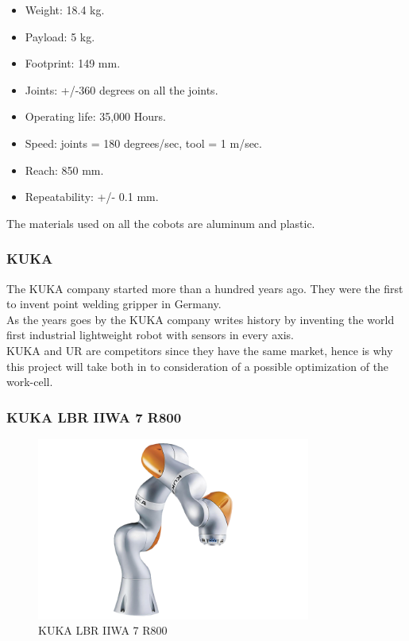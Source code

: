 \begin{itemize}
    \item Weight: 18.4 kg.
    \item Payload: 5 kg.
    \item Footprint: 149 mm.
    \item Joints: +/-360 degrees on all the joints.
    \item Operating life: 35,000 Hours.
    \item Speed: joints = 180 degrees/sec, tool = 1 m/sec.
    \item Reach: 850 mm.
    \item Repeatability: +/- 0.1 mm.
\end{itemize}
The materials used on all the cobots are aluminum and plastic\cite{Ur5_about}\cite{UR5_tech}.


\subsubsection{KUKA}

The KUKA company started more than a hundred years ago. They were the first to invent point welding gripper in Germany.\\
As the years goes by the KUKA company writes history by inventing the world first industrial lightweight robot with sensors in every axis.\\

KUKA and UR are competitors since they have the same market, hence is why this project will take both in to consideration of a possible optimization of the work-cell\cite{KukaHist}.\\


\subsubsection{KUKA LBR IIWA 7 R800}
\begin{figure}[h]
    \centering
    \includegraphics[width=9cm]{UR/1502895088_1.png}
    \caption{KUKA LBR IIWA 7 R800 \cite{KUKAbillede}}
    \label{fig:LBR IIWA}
\end{figure}

